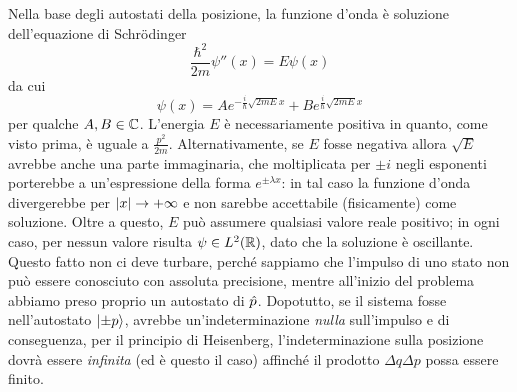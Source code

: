 Nella base degli autostati della posizione, la funzione d'onda è soluzione dell'equazione di Schr\"odinger
\begin{equation}
	\frac{\hbar^2}{2m}\psi''(x)=E\psi(x)
	\label{eq:schrodinger-particella-libera}
\end{equation}
da cui
\begin{equation}
	\psi(x)=Ae^{-\frac{i}{\hbar}\sqrt{2mE}x}+Be^{\frac{i}{\hbar}\sqrt{2mE}x}
	\label{eq:wf-particella-libera}
\end{equation}
per qualche $A,B\in\mathbb{C}$.
L'energia $E$ è necessariamente positiva in quanto, come visto prima, è uguale a $\frac{p^2}{2m}$.
Alternativamente, se $E$ fosse negativa allora $\sqrt{E}$ avrebbe anche una parte immaginaria, che moltiplicata per $\pm i$ negli esponenti porterebbe a un'espressione della forma $e^{\pm\lambda x}$: in tal caso la funzione d'onda divergerebbe per $\left|{x}\right|\to+\infty$ e non sarebbe accettabile (fisicamente) come soluzione.
Oltre a questo, $E$ può assumere qualsiasi valore reale positivo; in ogni caso, per nessun valore risulta $\psi\in L^2(\mathbb{R})$, dato che la soluzione è oscillante.
Questo fatto non ci deve turbare, perch\'e sappiamo che l'impulso di uno stato non può essere conosciuto con assoluta precisione, mentre all'inizio del problema abbiamo preso proprio un autostato di $\hat{p}$.
Dopotutto, se il sistema fosse nell'autostato $\left|{\pm p}\right\rangle$, avrebbe un'indeterminazione \emph{nulla} sull'impulso e di conseguenza, per il principio di Heisenberg, l'indeterminazione sulla posizione dovrà essere \emph{infinita} (ed è questo il caso) affinch\'e il prodotto $\Delta q\Delta p$ possa essere finito.

